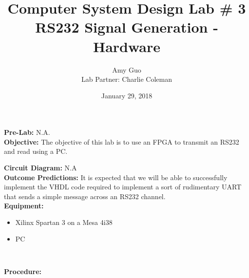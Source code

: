 \documentclass{article}
\title{Computer System Design Lab \# 3\\RS232 Signal Generation - Hardware}
\author{Amy Guo \\ Lab Partner: Charlie Coleman}
\date{January 29, 2018}
\newcommand{\sect}[1]{\noindent\textbf{#1}}
\begin{document}
\maketitle
\pagebreak

\sect{Pre-Lab:} N.A.\\

\sect{Objective:} The objective of this lab is to use an FPGA to transmit an RS232 and read using a PC.

\sect{Circuit Diagram:} N.A\\

\sect{Outcome Predictions:} It is expected that we will be able to successfully implement the VHDL code required to implement a sort of rudimentary UART that sends a simple message across an RS232 channel.\\

\sect{Equipment:}

\begin{itemize}[noitemsep, nolistsep]
	\item Xilinx Spartan 3 on a Mesa 4i38
	\item PC
\end{itemize}~

\sect{Procedure:}
\end{document}

